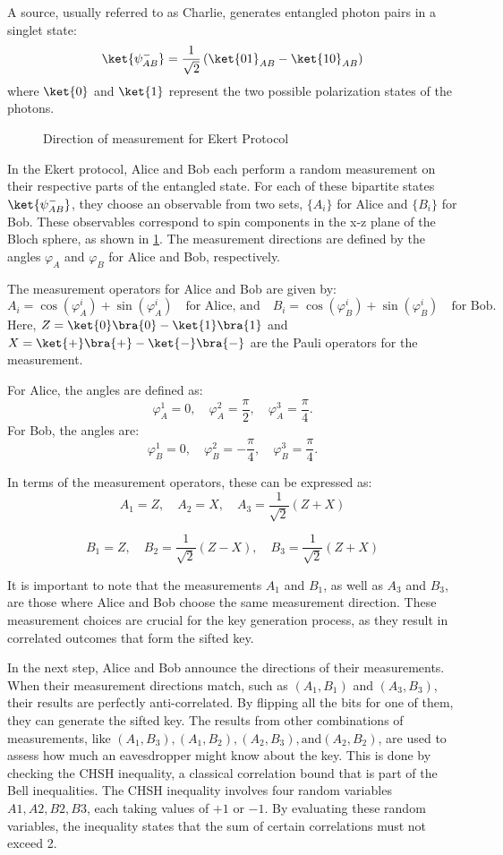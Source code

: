 \documentclass{article}
\begin{document}
A source, usually referred to as Charlie, generates entangled photon pairs in a singlet state:
\[\ket{\psi^{-}_{AB}} = \frac{1}{\sqrt{2}}\left(\ket{01}_{AB}-\ket{10}_{AB}\right)
\]
where $\ket{0}$ and $\ket{1}$ represent the two possible polarization states of the photons.
\begin{figure}[!h]
    
    \caption{Direction of measurement for Ekert Protocol}
    \label{fig:ekertMeasurement}
\end{figure}

In the Ekert protocol, Alice and Bob each perform a random measurement on their respective parts of the entangled state. For each of these bipartite states $\ket{\psi^{-}_{AB}}$, they choose an observable from two sets, $\{A_i\}$ for Alice and $\{B_i\}$ for Bob. These observables correspond to spin components in the x-z plane of the Bloch sphere, as shown in \ref{fig:ekertMeasurement}. The measurement directions are defined by the angles $\varphi_A$ and $\varphi_B$ for Alice and Bob, respectively.

The measurement operators for Alice and Bob are given by:
\[
    A_i = \cos(\varphi_A^i) + \sin(\varphi_A^i) \quad \text{for Alice, and} \quad B_i = \cos(\varphi_B^i) + \sin(\varphi_B^i) \quad \text{for Bob.}
\]
Here, $Z=\ket{0}\bra{0}-\ket{1}\bra{1}$ and $X=\ket{+}\bra{+}-\ket{-}\bra{-}$ are the Pauli operators for the measurement.

For Alice, the angles are defined as:
\[
    \varphi_A^1 = 0, \quad \varphi_A^2 = \frac{\pi}{2}, \quad \varphi_A^3 = \frac{\pi}{4}.
\]
For Bob, the angles are:
\[
    \varphi_B^1 = 0, \quad \varphi_B^2 = -\frac{\pi}{4}, \quad \varphi_B^3 = \frac{\pi}{4}.
\]

In terms of the measurement operators, these can be expressed as:
\[
    A_1 = Z, \quad A_2 = X, \quad A_3 = \frac{1}{\sqrt{2}} (Z + X)\]

\[B_1 = Z, \quad B_2 = \frac{1}{\sqrt{2}} (Z - X),  \quad B_3 = \frac{1}{\sqrt{2}} (Z + X)
\]

It is important to note that the measurements $A_1$ and $B_1$, as well as $A_3$ and $B_3$, are those where Alice and Bob choose the same measurement direction. These measurement choices are crucial for the key generation process, as they result in correlated outcomes that form the sifted key.

In the next step, Alice and Bob announce the directions of their measurements. When their measurement directions match, such as $(A_1 , B_1)$ and $(A_3 , B_3)$, their results are perfectly anti-correlated. By flipping all the bits for one of them, they can generate the sifted key. The results from other combinations of measurements, like $(A_1 , B_3), (A_1 , B_2), (A_2 , B_3), \text{and} (A_2 , B_2)$, are used to assess how much an eavesdropper might know about the key. This is done by checking the CHSH inequality, a classical correlation bound that is part of the Bell inequalities. The CHSH inequality involves four random variables \( A1, A2, B2, B3 \), each taking values of \( +1 \) or \( -1 \). By evaluating these random variables, the inequality states that the sum of certain correlations must not exceed 2.
\end{document}
